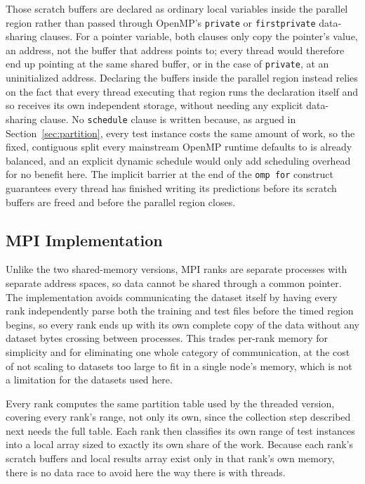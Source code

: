 \documentclass[conference]{IEEEtran}
\begin{document}
Those scratch buffers are declared as ordinary local variables inside the
parallel region rather than passed through OpenMP's \texttt{private} or
\texttt{firstprivate} data-sharing clauses. For a pointer variable, both
clauses only copy the pointer's value, an address, not the buffer that
address points to; every thread would therefore end up pointing at the
same shared buffer, or in the case of \texttt{private}, at an
uninitialized address. Declaring the buffers inside the parallel region
instead relies on the fact that every thread executing that region runs
the declaration itself and so receives its own independent storage,
without needing any explicit data-sharing clause. No \texttt{schedule}
clause is written because, as argued in Section~\ref{sec:partition}, every
test instance costs the same amount of work, so the fixed, contiguous
split every mainstream OpenMP runtime defaults to is already balanced, and
an explicit dynamic schedule would only add scheduling overhead for no
benefit here. The implicit barrier at the end of the \texttt{omp for} construct guarantees
every thread has finished writing its predictions before its scratch
buffers are freed and before the parallel region closes.

\subsection{MPI Implementation}

Unlike the two shared-memory versions, MPI ranks are separate processes
with separate address spaces, so data cannot be shared through a common
pointer. The implementation avoids communicating the dataset itself by
having every rank independently parse both the training and test files
before the timed region begins, so every rank ends up with its own
complete copy of the data without any dataset bytes crossing between
processes. This trades per-rank memory for simplicity and for eliminating
one whole category of communication, at the cost of not scaling to
datasets too large to fit in a single node's memory, which is not a
limitation for the datasets used here.

Every rank computes the same partition table used by the threaded version,
covering every rank's range, not only its own, since the collection step
described next needs the full table. Each rank then classifies its own
range of test instances into a local array sized to exactly its own share
of the work. Because each rank's scratch buffers and local results array
exist only in that rank's own memory, there is no data race to avoid here
the way there is with threads.
\end{document}
